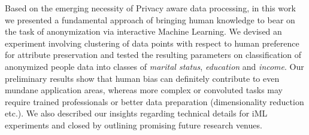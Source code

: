\documentclass{llncs}
\begin{document}
Based on the emerging necessity of Privacy aware data processing, in this work we presented a fundamental approach of bringing human knowledge to bear on the task of anonymization via interactive Machine Learning. We devised an experiment involving clustering of data points with respect to human preference for attribute preservation and tested the resulting parameters on classification of anonymized people data into classes of \textit{marital status}, \textit{education} and \textit{income}. Our preliminary results show that human bias can definitely contribute to even mundane application areas, whereas more complex or convoluted tasks may require trained professionals or better data preparation (dimensionality reduction etc.). We also described our insights regarding technical details for iML experiments and closed by outlining promising future research venues.

\newpage



\end{document}
